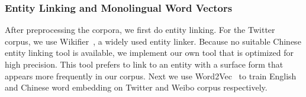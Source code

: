 \subsubsection{Entity Linking and Monolingual Word Vectors}
After preprocessing the corpora, we first do entity linking.
For the Twitter corpus, we use Wikifier~\cite{cheng2013relational,ratinov2011local}, a widely used
entity linker. 
Because no suitable Chinese entity linking tool is available, 
we implement our own tool that is optimized for high precision. 
This tool prefers to link to an entity with a surface form that appears
more frequently in our corpus. 
%
%
Next we use Word2Vec~\cite{Mikolov2013distributed} to train English and Chinese word embedding on Twitter and Weibo corpus respectively.

